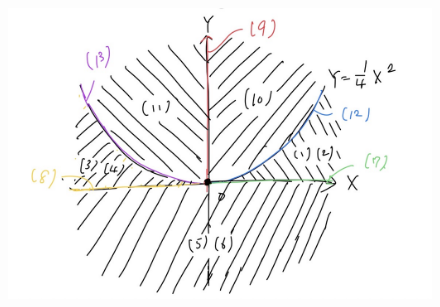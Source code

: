 \documentclass[pdflatex,ja=standard,fleqn]{bxjsarticle}
\begin{document}
\begin{figure}[htbp]
    \centering
    \includegraphics[width=15cm]{S__7847961.jpg}
\end{figure}
\end{document}
